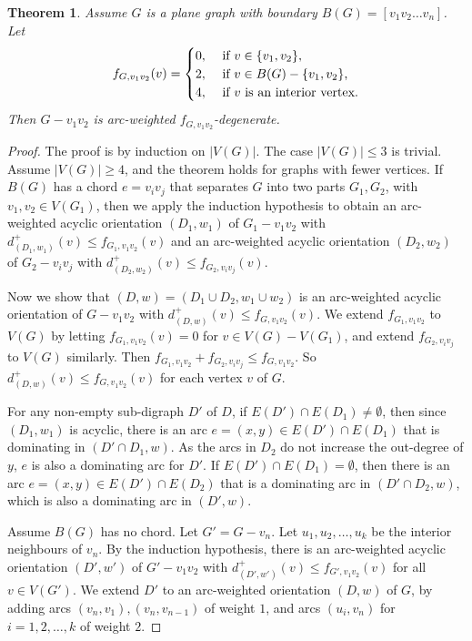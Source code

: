 \documentclass[11pt,a4paper]{article}
\newtheorem{theorem}{Theorem}
\theoremstyle{definition}
\begin{document}
\begin{theorem}
    \label{thm-planar}
    Assume $G$ is a plane graph with boundary $B(G)=[v_1v_2\ldots v_n]$.
    Let \[
    f_{G, v_1v_2} (v) = \begin{cases} 0, &\text{ if $v \in \{v_1,v_2\}$}, \cr
    2, &\text{ if $v \in B(G) - \{v_1,v_2\}$,} \cr 
    4, &\text{ if $v$ is an interior vertex}.   
    \end{cases}
    \]
   Then $G-v_1v_2$ is arc-weighted   $f_{G,v_1v_2}$-degenerate.
\end{theorem}
\begin{proof}
    The proof is by induction on $|V(G)|$. The case $|V(G)| \le 3$ is trivial. Assume $|V(G)|\ge 4$, and the theorem holds for graphs with fewer vertices. If $B(G)$ has a chord $e=v_iv_j$ that separates $G$ into two parts $G_1,G_2$, with $v_1, v_2 \in V(G_1)$, then we apply the induction hypothesis to obtain an arc-weighted   acyclic orientation $(D_1, w_1)$ of $G_1-v_1v_2$ with $d_{(D_1,w_1)}^+(v) \le f_{G_1, v_1v_2}(v)$ and an arc-weighted    acyclic orientation $(D_2, w_2)$ of $G_2-v_iv_j$ with $d_{(D_2,w_2)}^+(v) \le f_{G_2, v_iv_j}(v)$.
    
        Now we show that  
    $(D,w)= (D_1 \cup D_2, w_1\cup w_2)$ is an arc-weighted  acyclic orientation  of $G-v_1v_2$ with $d_{(D,w)}^+(v) \le f_{G, v_1v_2}(v)$. We extend $f_{G_1,v_1v_2}$ to $V(G)$ by letting $f_{G_1,v_1v_2}(v)=0$ for $v \in V(G)-V(G_1)$, and extend $f_{G_2,v_iv_j}$ to $V(G)$ similarly. Then 
   $f_{G_1,v_1v_2}+f_{G_2, v_iv_j} \le  f_{G, v_1v_2}$. So $d_{(D,w)}^+(v) \le f_{G, v_1v_2}(v)$ for each vertex $v$ of $G$. 

   For any non-empty sub-digraph $D'$ of $D$, if $E(D') \cap E(D_1) \ne \emptyset$, then since $(D_1, w_1)$ is acyclic, there is an  arc $e=(x,y) \in E(D') \cap E(D_1)$ that is dominating in $(D' \cap D_1, w)$. As the arcs in $D_2$ do not increase the out-degree of $y$,  $e$ is also a dominating arc for $D'$. If $E(D') \cap E(D_1) = \emptyset$, then  there is an arc $e=(x,y) \in E(D') \cap E(D_2)$ that is a dominating arc in $( D' \cap D_2, w)$, which is also a dominating arc in $(D',w)$.



    Assume $B(G)$ has no chord. Let $G'=G-v_n$. Let $u_1,u_2,\ldots, u_k$ be the interior neighbours of $v_n$. By the induction hypothesis, there is an arc-weighted    acyclic orientation $(D', w')$ of $G'-v_1v_2$ with $d_{(D',w')}^+(v) \le f_{G', v_1v_2}(v)$ for all $v \in V(G')$. We extend $D'$ to an arc-weighted orientation $(D,w)$ of $G$, by adding arcs $(v_n, v_1), (v_n,v_{n-1})$ of weight $1$, and arcs $(u_i,v_n)$ for $i=1,2,\ldots, k$  of weight $2$. 


\end{proof}
\end{document}

